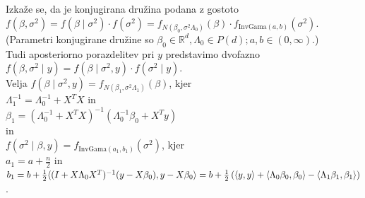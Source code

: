 \documentclass[a4paper, 12pt]{book}
\theoremstyle{definition}
\theoremstyle{remark}
\newcommand{\R}{\mathbb{R}}
\begin{document}
Izkaže se, da je konjugirana družina podana z gostoto \\
$f(\beta, \sigma^2) = f(\beta \mid \sigma^2) \cdot f(\sigma^2)
= f_{N(\beta_0, \sigma^2 \Lambda_0)}(\beta) \cdot f_{\text{InvGama}(a, b)}(\sigma^2)$. \\
(Parametri konjugirane družine so $\beta_0 \in \R^d, \Lambda_0 \in P(d); a, b \in (0, \infty)$.) \\
Tudi aposteriorno porazdelitev pri $y$ predstavimo dvofazno \\
$f(\beta, \sigma^2 \mid y) = f(\beta \mid \sigma^2, y) \cdot f(\sigma^2 \mid y)$. \\
Velja $f(\beta \mid \sigma^2, y) = f_{N(\beta_1, \sigma^2 \Lambda_1)}(\beta)$, kjer \\
$\Lambda_1^{-1} = \Lambda_0^{-1} + X^T X$ in \\
$\beta_1 = (\Lambda_0^{-1} + X^T X)^{-1} (\Lambda_0^{-1} \beta_0 + X^T y)$ \\
in \\
$f(\sigma^2 \mid \beta, y) = f_{\text{InvGama}(a_1, b_1)}(\sigma^2)$, kjer \\
$a_1 = a + \frac{n}{2}$ in \\
$b_1 = b + \frac{1}{2} \langle (I + X \Lambda_0 X^T)^{-1} (y - X \beta_0), y - X \beta_0 \rangle \\
= b + \frac{1}{2} \left( \langle y, y \rangle + \langle \Lambda_0 \beta_0, \beta_0 \rangle
 - \langle \Lambda_1 \beta_1, \beta_1 \rangle \right)$.


%
%



\end{document}
